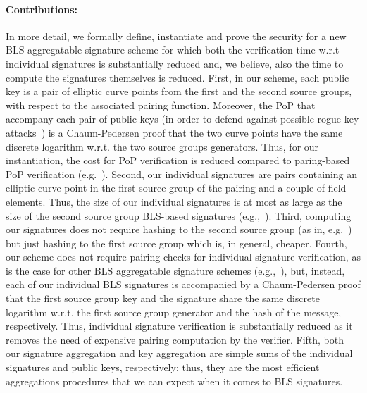 \paragraph{Contributions:} In more detail, we formally define, instantiate and prove the security for a new BLS aggregatable 
signature scheme for which both the verification time w.r.t individual signatures is substantially reduced and, we believe, 
also the time to compute the signatures themselves is reduced. First, in our scheme, each public key is a pair of elliptic curve 
points from the first and the second source groups, with respect to the associated pairing function. Moreover, the PoP that accompany 
each pair of public keys (in order to defend against possible rogue-key attacks~\cite{proofs_of_posession}) 
is a Chaum-Pedersen proof that the two curve points have the same discrete logarithm w.r.t. the two source groups 
generators. Thus, for our instantiation, the cost for PoP verification is reduced compared to paring-based PoP verification (e.g.~\cite{ourLC}). 
Second, our individual signatures are pairs containing an elliptic curve point in the first source group of the pairing and a couple of field elements. 
Thus, the size of our individual signatures is at most as large as the size of the second source group BLS-based signatures (e.g.,~\cite{dabo_book,ourLC}). 
Third, computing our signatures does not require hashing to the second source group (as in, e.g.~\cite{ourLC}) but just hashing to the first source group 
which is, in general, cheaper. Fourth, our scheme does not require pairing checks for individual signature verification, as is the case for other BLS 
aggregatable signature schemes (e.g.,~\cite{boneh_compact_multisig,ourLC}), but, instead, each of our individual BLS signatures 
is accompanied by a Chaum-Pedersen proof that the first source group key and the signature share the same discrete logarithm w.r.t. the first 
source group generator and the hash of the message, respectively. Thus, individual signature verification is substantially reduced as it removes the 
need of expensive pairing computation by the verifier. Fifth, both our signature aggregation and key aggregation are simple sums of the individual 
signatures and public keys, respectively; thus, they are the most efficient aggregations procedures that we can expect when it comes to BLS signatures. 


